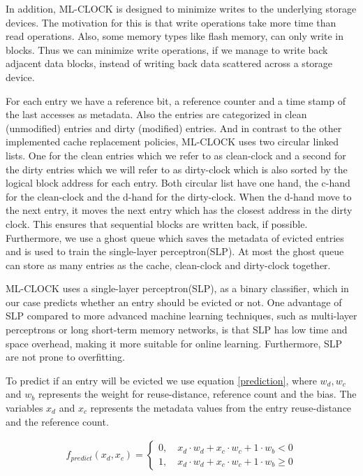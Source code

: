 \documentclass[
	12pt,
	a4paper,
	abstract,
	bibliography=totoc,
	chapterprefix,
	headings=openright,
	numbers=endperiod,
	parskip=half,
	twoside,
]{scrreprt}
\begin{document}
In addition, ML-CLOCK is designed to minimize writes to the underlying storage devices.
The motivation for this is that write operations take more time than read operations.
Also, some memory types like flash memory, can only write in blocks.
Thus we can minimize write operations, if we manage to write back adjacent data blocks, 
instead of writing back data scattered across a storage device.

For each entry we have a reference bit, a reference counter and a time stamp of the 
last accesses as metadata. 
Also the entries are categorized in clean (unmodified) entries and dirty (modified) entries.
And in contrast to the other implemented cache replacement policies,
ML-CLOCK uses two circular linked lists.
One for the clean entries which we refer to as clean-clock 
and a second for the dirty entries which we will refer to as dirty-clock
which is also sorted by the logical block address for each entry.
Both circular list have one hand, the c-hand for the clean-clock and 
the d-hand for the dirty-clock.
When the d-hand move to the next entry, it moves the next entry 
which has the closest address in the dirty clock.
This ensures that sequential blocks are written back, if possible.
Furthermore, we use a ghost queue which saves the metadata of evicted entries and 
is used to train the single-layer perceptron(SLP).
At most the ghost queue can store as many entries as the cache, clean-clock and dirty-clock together.

ML-CLOCK uses a single-layer perceptron(SLP), as a
binary classifier, which in our case predicts whether an entry should be evicted or not.
One advantage of SLP compared to more advanced machine learning techniques, such 
as multi-layer perceptrons or long short-term memory networks, is that
SLP has low time and space overhead,
making it more suitable for online learning.
Furthermore, SLP are not prone to overfitting.

To predict if an entry will be evicted we use equation \ref{prediction},
where $w_d, w_c$ and $w_b$ represents the weight for reuse-distance, reference count and the bias.
The variables $x_d$ and $x_c$ represents the metadata values from the entry reuse-distance and the reference count.

\begin{align}
	f_{predict} (x_d, x_c) =
	\begin{cases}
		0, \quad x_d \cdot w_d + x_c \cdot w_c + 1 \cdot w_b < 0 \\
		1, \quad x_d \cdot w_d + x_c \cdot w_c + 1 \cdot w_b \geq 0 \label{prediction}
	\end{cases}
\end{align}
\end{document}
